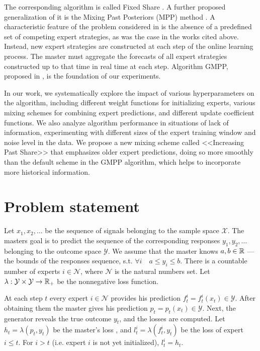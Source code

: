 \documentclass[12pt, twoside]{article}
\begin{document}
The corresponding algorithm is called Fixed Share \cite{article98}. 
A further proposed generalization of it is the Mixing Past Posteriors (MPP) method \cite{article02}. 
A characteristic feature of the problem considered in \cite{article} is the absence of a predefined set of competing expert strategies, as was the case in the works cited above.
Instead, new expert strategies are constructed at each step of the online learning process.
The master must aggregate the forecasts of all expert strategies constructed up to that time in real time at each step. 
Algorithm GMPP, proposed in \cite{article}, is the foundation of our experiments. 

In our work, we systematically explore the impact of various hyperparameters on the algorithm, including different weight functions for initializing experts, 
various mixing schemes for combining expert predictions, and different update coefficient functions. 
We also analyze algorithm performance in situations of lack of information,  experimenting with different sizes of the expert training window and noise level in the data. 
We propose a new mixing scheme called <<Increasing Past Share>> that emphasizes older expert predictions, 
doing so more smoothly than the default scheme in the GMPP algorithm, which helps to incorporate more historical information.

\section{Problem statement}

Let $x_1, x_2, \dots$ be the sequence of signals belonging to the sample space  $\mathcal{X}$. 
The masters goal is to predict the sequence of the corresponding responses $y_1, y_2, \dots$ belonging to the outcome space $\mathcal{Y}$. 
We assume that the master knows $a, b \in \mathbb{R}$ --- the bounds of the responses sequence, s.t. $\forall i\quad a \leq y_i \leq b$.
There is a countable number of experts $i \in \mathcal{N}$, where $\mathcal{N}$ is the natural numbers set. 
Let $ \lambda: \mathcal{Y} \times \mathcal{Y} \rightarrow \RR_+$ be the nonnegative loss function. 

At each step $t$ every expert $i \in \mathcal{N}$ provides his prediction $f_t^i = f_t^i(x_t)  \in \mathcal{Y}$. 
After obtaining them the master gives his prediction $p_t = p_t(x_t) \in \mathcal{Y}$. 
Next, the generator reveals the true outcome $y_t$, and the losses are computed.
Let $h_t = \lambda(p_t, y_t)$ be the master's loss , and $l_t^i = \lambda(f_t^i, y_t)$ be the loss of expert $i \le t$. For $i > t$ (i.e. expert $i$ is not yet initialized), $l_t^i = h_t$.
\end{document}
